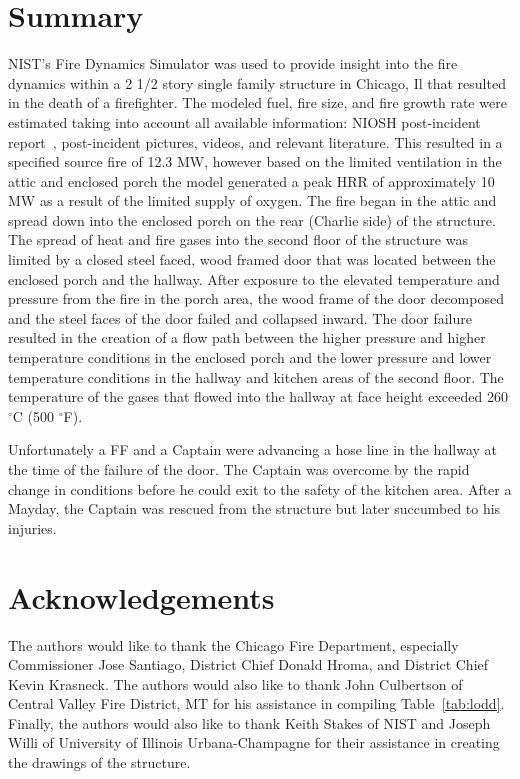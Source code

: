 \documentclass[11pt,oneside]{book}
\begin{document}
\chapter{Summary}
NIST's Fire Dynamics Simulator was used to provide insight into the fire dynamics within a 2 1/2 story single family structure in Chicago, Il that resulted in the death of a firefighter. The modeled fuel, fire size, and fire growth rate were estimated taking into account all available information: NIOSH post-incident report~\cite{NIOSH:Bowyer}, post-incident pictures, videos, and relevant literature. This resulted in a specified source fire of 12.3 MW, however based on the limited ventilation in the attic and enclosed porch the model generated a peak HRR of approximately 10 MW as a result of the limited supply of oxygen.  The fire began in the attic and spread down into the enclosed porch on the rear (Charlie side) of the structure.  The spread of heat and fire gases into the second floor of the structure was limited by a closed steel faced, wood framed door that was located between the enclosed porch and the hallway.  After exposure to the elevated temperature and pressure from the fire in the porch area, the wood frame of the door decomposed and the steel faces of the door failed and collapsed inward.  The door failure resulted in the creation of a flow path between the higher pressure and higher temperature conditions in the enclosed porch and the lower pressure and lower temperature conditions in the hallway and kitchen areas of the second floor.  The temperature of the gases that flowed into the hallway at face height exceeded 260 $^{\circ}$C (500 $^{\circ}$F). 

Unfortunately a FF and a Captain were advancing a hose line in the hallway at the time of the failure of the door.  The Captain was overcome by the rapid change in conditions before he could exit to the safety of the kitchen area.  After a Mayday, the Captain was rescued from the structure but later succumbed to his injuries.


\chapter{Acknowledgements}
The authors would like to thank the Chicago Fire Department, especially Commissioner Jose Santiago, District Chief Donald Hroma, and District Chief Kevin Krasneck. The authors would also like to thank John Culbertson of Central Valley Fire District, MT for his assistance in compiling Table~\ref{tab:lodd}. Finally, the authors would also like to thank Keith Stakes of NIST and Joseph Willi of University of Illinois Urbana-Champagne for their assistance in creating the drawings of the structure.
\end{document}
